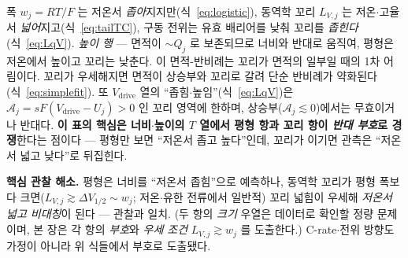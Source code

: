 \documentclass[11pt,a4paper]{article}
\newcommand{\drive}{\mathrm{drive}}
\begin{document}
폭 $w_j=RT/F$ 는 저온서 \emph{좁아}지지만(식~\eqref{eq:logistic}), 동역학 꼬리 $L_{V,j}$ 는 저온$\cdot$고율서
\emph{넓어}지고(식~\eqref{eq:tailTC}), 구동 전위는 유효 배리어를 낮춰 꼬리를 \emph{좁힌다}(식~\eqref{eq:LqV}).
\emph{높이 행} — 면적이 $\sim Q_j$ 로 보존되므로 너비와 반대로 움직여, 평형은 저온에서 높이고 꼬리는 낮춘다.
이 면적-반비례는 꼬리가 면적의 일부일 때의 1차 어림이다. 꼬리가 우세해지면 면적이 상승부와 꼬리로 갈려 단순
반비례가 약화된다(식~\eqref{eq:simplefit}). 또 $V_\drive$ 열의 ``좁힘$\cdot$높임''(식~\eqref{eq:LqV})은
$\mathcal A_j=sF(V_\drive-U_j)>0$ 인 꼬리 영역에 한하며, 상승부($\mathcal A_j\lesssim0$)에서는 무효이거나
반대다. \textbf{이 표의 핵심은 너비$\cdot$높이의
$T$ 열에서 평형 항과 꼬리 항이 \emph{반대 부호}로 경쟁}한다는 점이다 — 평형만 보면 ``저온서 좁고 높다''인데, 꼬리가
이기면 관측은 ``저온서 넓고 낮다''로 뒤집힌다.

\textbf{핵심 관찰 해소.} 평형은 너비를 ``저온서 좁힘''으로 예측하나, 동역학 꼬리가 평형 폭보다 크면($L_{V,j}
\gtrsim\Delta V_{1/2}\sim w_j$; 저온$\cdot$유한 전류에서 일반적) 꼬리 넓힘이 우세해 \emph{저온서 넓고 비대칭}이
된다 — 관찰과 일치. (두 항의 \emph{크기} 우열은 데이터로 확인할 정량 문제이며, 본 장은 각 항의 \emph{부호}와
\emph{우세 조건} $L_{V,j}\gtrsim w_j$ 를 도출한다.) C-rate$\cdot$전위 방향도 가정이 아니라
위 식들에서 부호로 도출됐다.
\end{document}
